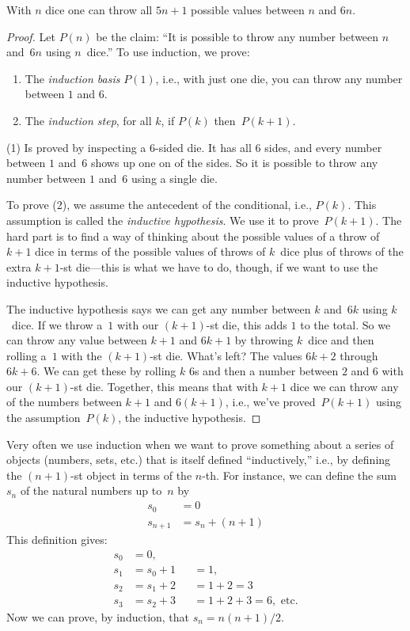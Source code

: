 \documentclass[../../../include/open-logic-section]{subfiles}
\begin{document}
\begin{thm}
  With $n$ dice one can throw all $5n+1$ possible values between $n$
  and $6n$.
\end{thm}

\begin{proof}
Let $P(n)$ be the claim: ``It is possible to throw any number between
$n$ and~$6n$ using $n$~dice.''  To use induction, we prove:
\begin{enumerate}
\item The \emph{induction basis} $P(1)$, i.e., with just one die,
  you can throw any number between $1$ and $6$.
\item The \emph{induction step}, for all $k$, if $P(k)$ then~$P(k+1)$.
\end{enumerate}

(1) Is proved by inspecting a $6$-sided die. It has all 6 sides, and
every number between $1$ and~$6$ shows up one on of the sides. So it
is possible to throw any number between $1$ and~$6$ using a single
die.

To prove (2), we assume the antecedent of the conditional, i.e.,
$P(k)$. This assumption is called the \emph{inductive hypothesis}.  We
use it to prove~$P(k+1)$. The hard part is to find a way of thinking
about the possible values of a throw of $k+1$ dice in terms of the
possible values of throws of $k$~dice plus of throws of the extra
$k+1$-st die---this is what we have to do, though, if we want to use
the inductive hypothesis.

The inductive hypothesis says we can get any number between $k$
and~$6k$ using $k$~dice.  If we throw a~$1$ with our $(k+1)$-st die,
this adds $1$ to the total. So we can throw any value between $k+1$
and $6k+1$ by throwing $k$~dice and then rolling a~$1$ with the
$(k+1)$-st die.  What's left?  The values $6k+2$ through $6k+6$.  We
can get these by rolling $k$ $6$s and then a number between $2$ and
$6$ with our $(k+1)$-st die. Together, this means that with $k+1$ dice
we can throw any of the numbers between $k+1$ and $6(k+1)$, i.e.,
we've proved~$P(k+1)$ using the assumption~$P(k)$, the inductive
hypothesis.
\end{proof}

Very often we use induction when we want to prove something about a
series of objects (numbers, sets, etc.) that is itself defined
``inductively,'' i.e., by defining the $(n+1)$-st object in terms of
the $n$-th.  For instance, we can define the sum~$s_n$ of the natural
numbers up to~$n$ by
\begin{align*}
  s_0 & = 0\\
  s_{n+1} & = s_n + (n+1)
\end{align*}
This definition gives:
\begin{align*}
  s_0 & = 0,\\
  s_1 & = s_0 + 1 && = 1,\\
  s_2 & = s_1 + 2 && = 1 + 2 = 3\\
  s_3 & = s_2 + 3 && = 1 + 2 + 3 = 6, \text{ etc.}
\end{align*}
Now we can prove, by induction, that $s_n = n(n+1)/2$.
\end{document}
